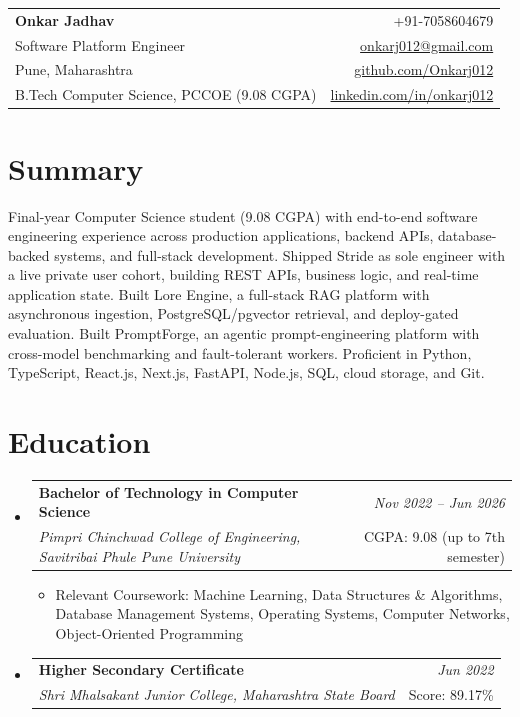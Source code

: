 \documentclass[a4paper,11pt]{article}
\makeatletter
\newcommand{\resumeSubheading}[4]{
\vspace{0.5mm}\item
    \begin{tabular*}{0.98\textwidth}[t]{l@{\extracolsep{\fill}}r}
        \textbf{#1} & \textit{\footnotesize{#4}} \\
        \textit{\footnotesize{#3}} & \footnotesize{#2}\\
    \end{tabular*}
    \vspace{-2.4mm}
}
\newcommand{\resumeSubHeadingListStart}{\begin{itemize}[leftmargin=*,labelsep=0mm]}
\newcommand{\resumeItemListStart}{\begin{justify}\begin{itemize}[leftmargin=3ex, rightmargin=2ex, noitemsep,labelsep=1.2mm,itemsep=0mm]\small}
\newcommand{\resumeSubHeadingListEnd}{\end{itemize}\vspace{2mm}}
\newcommand{\resumeItemListEnd}{\end{itemize}\end{justify}\vspace{-2mm}}
\newcommand{\name}{Onkar Jadhav}
\newcommand{\phone}{7058604679}
\newcommand{\emaila}{onkarj012@gmail.com}
\newcommand{\github}{github.com/Onkarj012}
\newcommand{\linkedin}{linkedin.com/in/onkarj012}
\makeatother
\begin{document}
\selectfont

\begin{tabularx}{\linewidth}{L r}
  \textbf{\Large \name} & {+91-\phone}\\
  {Software Platform Engineer} & \href{mailto:\emaila}{\emaila} \\
  {Pune, Maharashtra} & \href{https://\github}{\github} \\
  {B.Tech Computer Science, PCCOE (9.08 CGPA)} & \href{https://\linkedin}{\linkedin}
\end{tabularx}
\vspace{-4mm}

\section{\textbf{Summary}}
\vspace{1mm}
\small{
Final-year Computer Science student (9.08 CGPA) with end-to-end software engineering experience across production applications, backend APIs, database-backed systems, and full-stack development. Shipped Stride as sole engineer with a live private user cohort, building REST APIs, business logic, and real-time application state. Built Lore Engine, a full-stack RAG platform with asynchronous ingestion, PostgreSQL/pgvector retrieval, and deploy-gated evaluation. Built PromptForge, an agentic prompt-engineering platform with cross-model benchmarking and fault-tolerant workers. Proficient in Python, TypeScript, React.js, Next.js, FastAPI, Node.js, SQL, cloud storage, and Git.
}
\vspace{-3mm}

\section{\textbf{Education}}
  \resumeSubHeadingListStart
    \resumeSubheading
      {Bachelor of Technology in Computer Science}{CGPA: 9.08 (up to 7th semester)}
      {Pimpri Chinchwad College of Engineering, Savitribai Phule Pune University}{Nov 2022 -- Jun 2026}
      \resumeItemListStart
        \item {Relevant Coursework: Machine Learning, Data Structures \& Algorithms, Database Management Systems, Operating Systems, Computer Networks, Object-Oriented Programming}
      \resumeItemListEnd
    \resumeSubheading
      {Higher Secondary Certificate}{Score: 89.17\%}
      {Shri Mhalsakant Junior College, Maharashtra State Board}{Jun 2022}
  \resumeSubHeadingListEnd
\vspace{-5.5mm}
\end{document}

